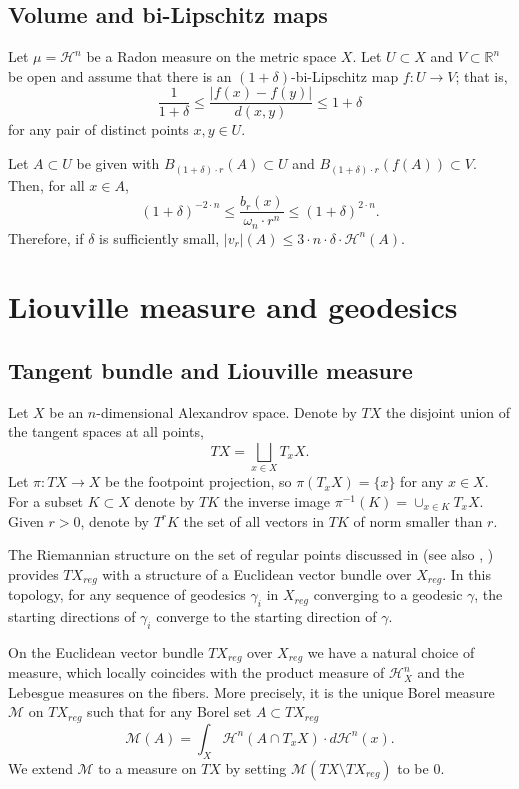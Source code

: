 \documentclass[12pt,leqno,intlimits]{amsart}
\numberwithin{equation}{section}
\theoremstyle{definition}
\theoremstyle{remark}
\newcommand{\R}{\mathbb{R}}
\def\:{\colon}
\begin{document}
\subsection{Volume and bi-Lipschitz maps}
Let $\mu =\mathcal H^n$ be a Radon measure on the metric space $X$.
Let $U\subset X$ and $V\subset \R^n$ be open and assume that there is an $(1+\delta)$-bi-Lipschitz map $f\:U \to V$;
that is,
\[\frac1{1+\delta}\le\frac{|f(x)-f(y)|}{d(x,y)}\le 1+\delta\]
for any pair of distinct points $x,y\in U$.

Let $A\subset U$ be given with
$B_{(1+\delta) \cdot r} (A) \subset U$ and $B_{(1+\delta) \cdot r} (f(A)) \subset V$. Then, for all $x\in A$,
\begin{equation} \label{eq:bilip}
(1+\delta) ^{-2\cdot n} \leq \frac {b_r(x)} {\omega _n \cdot r^n} \leq (1+\delta ) ^{2\cdot n}.
\end{equation}
Therefore, if $\delta $ is sufficiently small, $|v_r | (A) \leq 3\cdot  n \cdot \delta \cdot \mathcal H^n (A).$

\section{Liouville measure and geodesics} \label{sec:Liou}
\subsection{Tangent bundle and Liouville measure} \label{subsec:tb}
Let $X$ be an $n$-dimensional Alexandrov space.
Denote by $TX$ the disjoint union of the tangent spaces at all points,
\[TX=\bigsqcup_{x\in X} T_x X.\]
Let $\pi\:TX\to X$ be the footpoint projection, so $\pi (T_xX)=\{x\}$ for any $x\in X$. %
For a subset $K\subset X$ denote by $TK$ the inverse image $\pi^{-1} (K)= \cup _{x\in K} T_xX$. %
Given $r>0$, denote by $T^r K$ the set of all vectors in $TK$ of norm smaller than $r$.


The Riemannian structure on the set of regular points discussed in \cite{Otsu-Shioya} (see also \cite{Shioya}, \cite{Per-DC}) provides $TX_{reg}$ with a structure of a Euclidean vector bundle over $X_{reg}$. In this topology, for any sequence of geodesics $\gamma _i$ in $X_{reg}$ converging to a geodesic $\gamma$, the starting directions of $\gamma _i$ converge to the starting direction of $\gamma$.

On the Euclidean vector bundle $TX_{reg}$ over $X_{reg}$ we have a natural choice of measure, which locally coincides with the product measure of $\mathcal H^n _X$ and the Lebesgue measures on the fibers. More precisely,
it is the unique Borel measure $\mathcal M$ on $TX_{reg}$ such that for any Borel set $A\subset TX_{reg}$
$$\mathcal M(A)= \int _X \mathcal H^n(A \cap T_x X) \cdot d\mathcal H^n (x).$$
We extend $\mathcal M$ to a measure on $TX$ by setting $\mathcal M(TX\setminus TX_{reg})$ to be $0$.
\end{document}
